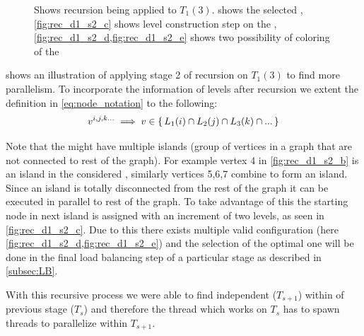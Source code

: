 \begin{figure}[thbp]
     	\caption{Shows recursion being applied to $T_1(3)$.  shows the selected \subgraph, \cref{fig:rec_d1_s2_c} shows level construction step on the \subgraph, \cref{fig:rec_d1_s2_d,fig:rec_d1_s2_e} shows two possibility of \DONE coloring of the \subgraph}
     	
     	\label{fig:rec_d1_s2}
     \end{figure}
     
      shows an illustration of applying stage 2 of recursion on $T_1(3)$ to find more parallelism. To incorporate the information of levels after recursion we extent the definition in \cref{eq:node_notation} to the following:
	 \begin{equation}
	    v^{i,j,k...} \implies v \in \set{L_1(i) \cap L_2(j) \cap L_3(k) \cap ...} 
	 \end{equation}
     
     Note that the \subgraphs might have multiple islands (group of vertices in a graph that are not connected to rest of the graph). For example vertex 4 in \cref{fig:rec_d1_s2_b} is an island in the considered \subgraph, similarly vertices 5,6,7 combine to form an island. Since an island is totally disconnected from the rest of the graph it can be executed in parallel to rest of the graph. To take advantage of this the starting node in next island is assigned with an increment of two levels, as seen in \cref{fig:rec_d1_s2_c}. Due to this there exists multiple valid \DONE configuration (here \cref{fig:rec_d1_s2_d,fig:rec_d1_s2_e}) and the selection of the optimal one will be done in the final load balancing step of a particular stage as described in \cref{subsec:LB}.    
     
     With this recursive process we were able to find independent \levelGroups ($T_{s+1}$) within \levelGroup of previous stage ($T_s$) and therefore the thread which works on $T_s$ has to spawn threads to parallelize within $T_{s+1}$.
     
